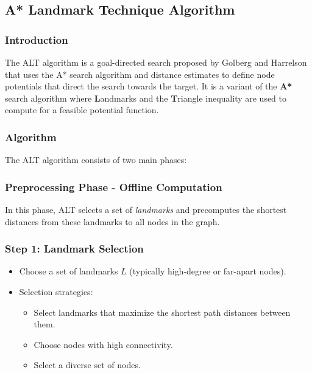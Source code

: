 
	\subsection{A* Landmark Technique  Algorithm}

		\subsubsection{Introduction}
		
			The ALT algorithm is a goal-directed search proposed by Golberg and Harrelson that uses the A* search algorithm and distance estimates to define node potentials that direct the search towards the target.
			It is a variant of the \textbf{A*} search algorithm where \textbf{L}andmarks and the \textbf{T}riangle inequality are used to compute for a feasible potential function. 

				\subsubsection{Algorithm}
						
				The ALT algorithm consists of two main phases:
				\subsubsection{Preprocessing Phase - Offline Computation}
				In this phase, ALT selects a set of \textit{landmarks} and precomputes the shortest distances from these landmarks to all nodes in the graph.
				
				\subsubsection{Step 1: Landmark Selection}
				\begin{itemize}
					\item Choose a set of landmarks $ \textit{L} $ (typically high-degree or far-apart nodes).
					\item Selection strategies:
					\begin{itemize}
						\item Select landmarks that maximize the shortest path distances between them.
						\item Choose nodes with high connectivity.
						\item Select a diverse set of nodes.
						
					\end{itemize}
				\end{itemize}
				
